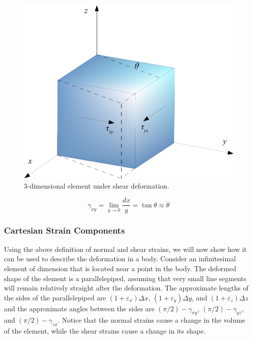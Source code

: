 \documentclass[
10pt,
a4paper,
openany,
svgnames,
]{book}
\begin{document}
\begin{figure}
  \centering
  \includegraphics[scale=0.6]{pictures/Static-body-load-analysis/3d-shear-deformation}
  \caption{3-dimensional element under shear deformation.}
  \label{fig: 3d shear deformation}
\end{figure}

\begin{equation}
  \gamma _{xy} = \mathop {\lim }\limits_{y \to 0} \frac{dx}{y} = \tan \theta  \approx \theta
\end{equation}
 
\subsubsection{Cartesian Strain Components}

Using the above definition of normal and shear strains, we will now show how it can be used to describe the deformation in a body. Consider an infinitesimal element of dimension that is located near a point in the body. The deformed shape of the element is a parallelepiped, assuming that very small line segments will remain relatively straight after the deformation. The approximate lengths of the sides of the parallelepiped are  $(1 + \varepsilon_x)\Delta x$, $(1 + \varepsilon_y)\Delta y$, and $(1 + \varepsilon_z)\Delta z$ and the approximate angles between the sides are $(\pi /2) - \gamma_{xy}$, $(\pi /2) - \gamma_{yz}$, and $(\pi /2) - \gamma _{zx}$. Notice that the normal strains cause a change in the volume of the element, while the shear strains cause a change in its shape.
\end{document}
